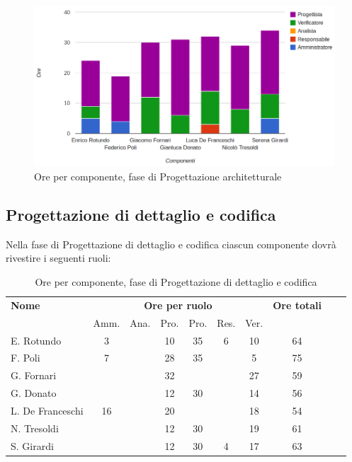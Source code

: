 \begin{figure}[H]
\centering
\includegraphics[scale=0.35]{4-2.png}
\caption{Ore per componente, fase di Progettazione architetturale\label{fig:nome}}
\end{figure}

\pagebreak
\subsection{Progettazione di dettaglio e codifica}

Nella fase di Progettazione di dettaglio e codifica ciascun componente dovrà rivestire i seguenti ruoli:

\begin{table}[H]
\centering
\begin{tabular}{lccccccccc}
\toprule 
    \textbf{Nome}  & \multicolumn{6}{c}{\textbf{Ore per ruolo}} & \textbf{Ore totali}\\
    & Amm. & Ana. & Pro. & Pro. & Res. & Ver. \\
    \midrule
    E. Rotundo   	& 3 &  &	 10	& 35 & 6 & 10 &	64 \\
    F. Poli  		& 7	&  &	 28	& 35 &   & 5  & 75 \\
    G. Fornari		& 	&  &	 32	&    &   & 27 & 59 \\
    G. Donato 		& 	&  &	 12	& 30 &   & 14 & 56 \\
    L. De Franceschi 	& 16	&  &	 20	&    &   & 18 & 54 \\
    N. Tresoldi 		& 	&  &	 12	& 30 &   & 19 & 61 \\
   	S. Girardi 		& 	&  &	 12	& 30 & 4 & 17 & 63 \\
    
    \bottomrule
\end{tabular}
\caption{Ore per componente, fase di Progettazione di dettaglio e codifica}
\end{table}


